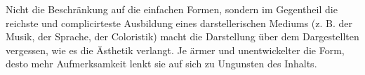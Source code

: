 Nicht die Beschränkung auf die einfachen Formen, sondern im Gegentheil die reichste und complicirteste Ausbildung eines darstellerischen Mediums (z. B. der Musik, der Sprache, der Coloristik) macht die Darstellung über dem Dargestellten vergessen, wie es die Ästhetik verlangt. Je ärmer und unentwickelter die Form, desto mehr Aufmerksamkeit lenkt sie auf sich zu Ungunsten des Inhalts.
\par

